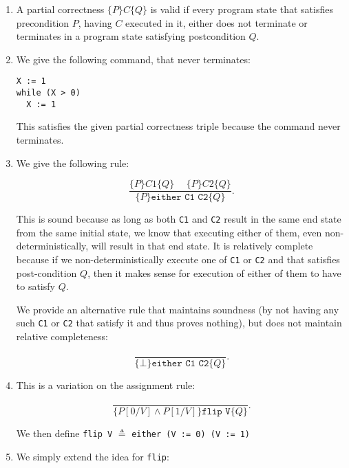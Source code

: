 


\begin{enumerate}[label=(\alph*)]

  \item

    A partial correctness $\{P\} C \{Q\}$ is valid if every program state that satisfies precondition $P$, having $C$ executed in it, either does not terminate or terminates in a program state satisfying postcondition $Q$.

  \item
    We give the following command, that never terminates:

\begin{verbatim}
X := 1
while (X > 0)
  X := 1
\end{verbatim}

     This satisfies the given partial correctness triple because the command never terminates.

   \item

     We give the following rule:

     \[
       \frac{\{P\}C1\{Q\} \hspace{15pt} \{P\}C2\{Q\}}{\{P\}\texttt{either C1 C2}\{Q\}}
     .\] 

     This is sound because as long as both \texttt{C1} and \texttt{C2} result in the same end state from the same initial state, we know that executing either of them, even non-deterministically, will result in that end state. It is relatively complete because if we non-deterministically execute one of \texttt{C1} or \texttt{C2} and that satisfies post-condition $Q$, then it makes sense for execution of either of them to have to satisfy $Q$.

     We provide an alternative rule that maintains soundness (by not having any such \texttt{C1} or \texttt{C2} that satisfy it and thus proves nothing), but does not maintain relative completeness:

     \[
       \frac{}{\{\bot\}\texttt{either C1 C2}\{Q\}}
     .\] 

   \item
     This is a variation on the assignment rule:

     \[
     \frac{}{\{P[0 / V] \wedge P[1 / V]\}\texttt{flip V}\{Q\}}
     .\] 

     We then define \texttt{flip V} $\triangleq$ \texttt{either (V := 0) (V := 1)}

   \item
     We simply extend the idea for \texttt{flip}:


\end{enumerate}
